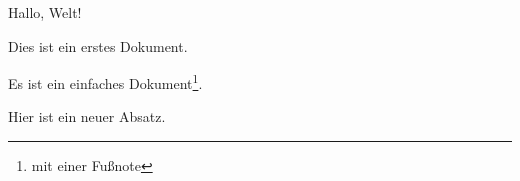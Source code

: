\documentclass[a4paper, 12pt]{article} %
\begin{document}
Hallo, Welt!

Dies ist ein erstes Dokument.

Es ist    ein einfaches
Dokument\footnote{mit einer Fußnote}.

Hier ist ein neuer Absatz.
\end{document}
